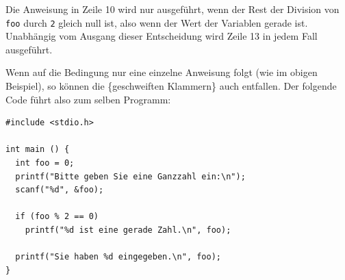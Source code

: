 Die Anweisung in Zeile 10 wird nur ausgeführt, wenn der Rest der Division von \texttt{foo} durch \texttt{2} gleich null ist, also wenn der Wert der Variablen gerade ist. Unabhängig vom Ausgang dieser Entscheidung wird Zeile 13 in jedem Fall ausgeführt.

Wenn auf die Bedingung nur eine einzelne Anweisung folgt (wie im obigen Beispiel), so können die \{geschweiften Klammern\} auch entfallen. Der folgende Code führt also zum selben Programm:

\begin{codebox}
\begin{verbatim}
#include <stdio.h>

int main () {
  int foo = 0;
  printf("Bitte geben Sie eine Ganzzahl ein:\n");
  scanf("%d", &foo);
   
  if (foo % 2 == 0)
    printf("%d ist eine gerade Zahl.\n", foo);
    
  printf("Sie haben %d eingegeben.\n", foo);
}
\end{verbatim}
\end{codebox}

